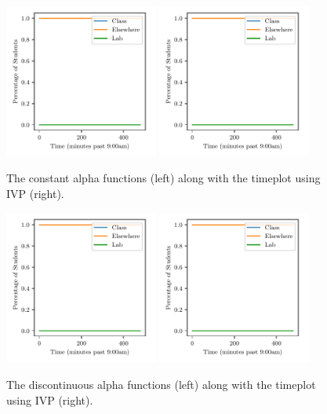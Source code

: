 \documentclass[11pt]{amsart}
\begin{document}
\begin{figure}[htp]
    \centering
    \includegraphics[width=0.45\textwidth]{temp.pdf}\hfill
    \includegraphics[width=0.45\textwidth]{temp.pdf}\hfill
    \caption{The constant alpha functions (left) along with the timeplot using IVP (right).}
    \label{fig:constant_alpha}

\end{figure}


\begin{figure}[htp]
    \centering
    \includegraphics[width=0.45\textwidth]{temp.pdf}\hfill
    \includegraphics[width=0.45\textwidth]{temp.pdf}\hfill

    \caption{The discontinuous alpha functions (left) along with the timeplot using IVP (right).}
    \label{fig:discontinuous_alpha}

\end{figure}
\end{document}
